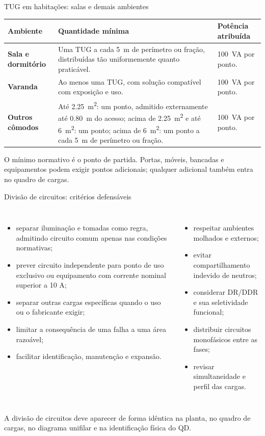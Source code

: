 \begin{frame}{TUG em habitações: salas e demais ambientes}
\scriptsize
\begin{tabularx}{\textwidth}{>{\bfseries}p{3.0cm}p{4.45cm}X}
\toprule
Ambiente & Quantidade mínima & Potência atribuída \\
\midrule
Sala e dormitório & Uma TUG a cada \SI{5}{m} de perímetro ou fração, distribuídas tão uniformemente quanto praticável. & \SI{100}{VA} por ponto. \\
Varanda & Ao menos uma TUG, com solução compatível com exposição e uso. & \SI{100}{VA} por ponto. \\
Outros cômodos & Até \SI{2.25}{m^2}: um ponto, admitido externamente até \SI{0.80}{m} do acesso; acima de \SI{2.25}{m^2} e até \SI{6}{m^2}: um ponto; acima de \SI{6}{m^2}: um ponto a cada \SI{5}{m} de perímetro ou fração. & \SI{100}{VA} por ponto. \\
\bottomrule
\end{tabularx}
\begin{caixaAt}
O mínimo normativo é o ponto de partida. Portas, móveis, bancadas e equipamentos podem exigir pontos adicionais; qualquer adicional também entra no quadro de cargas.
\end{caixaAt}
\end{frame}

\begin{frame}[shrink=8]{Divisão de circuitos: critérios defensáveis}
\small
\begin{columns}[T,onlytextwidth]
\begin{itemize}
\item separar iluminação e tomadas como regra, admitindo circuito comum apenas nas condições normativas;
\item prever circuito independente para ponto de uso exclusivo ou equipamento com corrente nominal superior a 10 A;
\item separar outras cargas específicas quando o uso ou o fabricante exigir;
\item limitar a consequência de uma falha a uma área razoável;
\item facilitar identificação, manutenção e expansão.
\end{itemize}
\begin{itemize}
\item respeitar ambientes molhados e externos;
\item evitar compartilhamento indevido de neutros;
\item considerar DR/DDR e sua seletividade funcional;
\item distribuir circuitos monofásicos entre as fases;
\item revisar simultaneidade e perfil das cargas.
\end{itemize}
\end{columns}
\begin{caixaObs}
A divisão de circuitos deve aparecer de forma idêntica na planta, no quadro de cargas, no diagrama unifilar e na identificação física do QD.
\end{caixaObs}
\end{frame}

